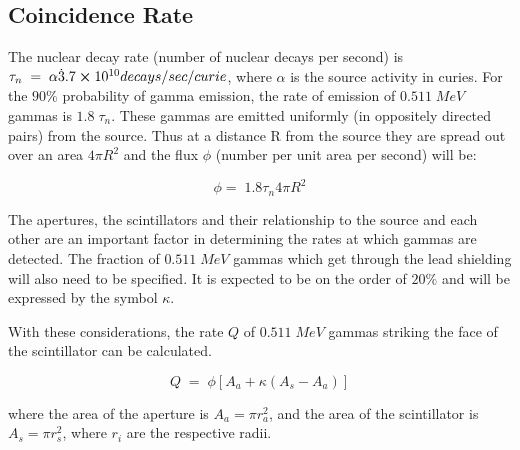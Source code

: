 	\subsection{Coincidence Rate}
		The nuclear decay rate (number of nuclear decays per second) is $\tau_n\; =\; \alpha \dot3.7 \cross 10^{10} decays/sec/curie$, where $\alpha$ is the source activity in curies. For the $90\%$ probability of gamma emission, the rate of emission of $0.511\; MeV$ gammas is $1.8\;\tau_n$. These gammas are emitted uniformly (in oppositely directed pairs) from	the source. Thus at a distance R from the source they are spread out over an area $4\pi R^2$ and the flux $\phi$ (number per unit area per second) will be:
		
		$$\phi =\; 1.8\tau_n4\pi R^2$$

		The apertures, the scintillators and their relationship to the source and each other are an important factor in determining the rates at which gammas are detected. The fraction of $0.511\; MeV$ gammas which get through the lead shielding will also need to be specified. It is expected to be on the order of $20\%$ and will be expressed by the symbol $\kappa$.

		With these considerations, the rate $Q$ of $0.511\; MeV$ gammas striking the face of the scintillator can be calculated. 
		
		$$Q\;=\; \phi[A_a + \kappa(A_s - A_a)]$$

		where the area of the aperture is $A_a = \pi r_a^2$, and the area of the scintillator is $A_s = \pi r^2_s$, where $r_i$ are the respective radii.